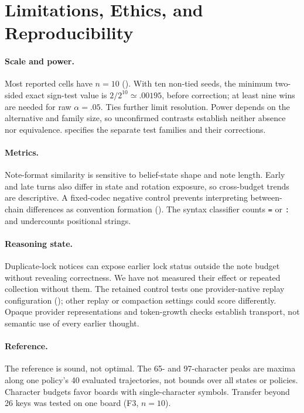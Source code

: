 \section{Limitations, Ethics, and Reproducibility}\label{sec:limits}

\paragraph{Scale and power.} Most reported cells have $n{=}10$ (). With ten non-tied seeds, the minimum two-sided exact sign-test value is $2/2^{10}\simeq .00195$, before correction; at least nine wins are needed for raw $\alpha{=}.05$. Ties further limit resolution. Power depends on the alternative and family size, so unconfirmed contrasts establish neither absence nor equivalence.  specifies the separate test families and their corrections.

\paragraph{Metrics.} Note-format similarity is sensitive to belief-state shape and note length. Early and late turns also differ in state and rotation exposure, so cross-budget trends are descriptive. A fixed-codec negative control prevents interpreting between-chain differences as convention formation (). The syntax classifier counts \texttt{=} or \texttt{:} and undercounts positional strings.

\paragraph{Reasoning state.} Duplicate-lock notices can expose earlier lock status outside the note budget without revealing correctness. We have not measured their effect or repeated collection without them. The retained control tests one provider-native replay configuration (); other replay or compaction settings could score differently. Opaque provider representations and token-growth checks establish transport, not semantic use of every earlier thought.

\paragraph{Reference.} The reference is sound, not optimal. The 65- and 97-character peaks are maxima along one policy's 40 evaluated trajectories, not bounds over all states or policies. Character budgets favor boards with single-character symbols. Transfer beyond 26 keys was tested on one board (F3, $n{=}10$).

